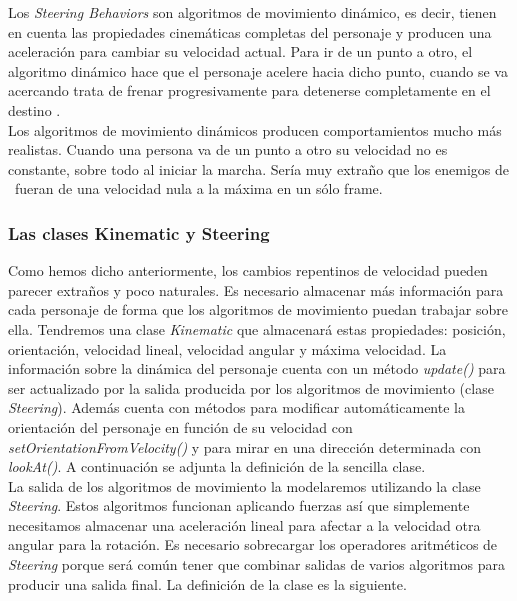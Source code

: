 Los \textit{Steering Behaviors} son algoritmos de movimiento dinámico,
es decir, tienen en cuenta las propiedades cinemáticas completas del personaje
y producen una aceleración para cambiar su velocidad actual. Para ir de un
punto a otro, el algoritmo dinámico hace que el personaje acelere hacia dicho
punto, cuando se va acercando trata de frenar progresivamente para detenerse
completamente en el destino \cite{mill09}.\\

Los algoritmos de movimiento dinámicos producen comportamientos mucho más
realistas. Cuando una persona va de un punto a otro su velocidad no es constante,
sobre todo al iniciar la marcha. Sería muy extraño que los enemigos de \juego\
fueran de una velocidad nula a la máxima en un sólo frame.\\


\subsubsection{Las clases Kinematic y Steering}

Como hemos dicho anteriormente, los cambios repentinos de velocidad pueden
parecer extraños y poco naturales. Es necesario almacenar más información
para cada personaje de forma que los algoritmos de movimiento puedan trabajar
sobre ella. Tendremos una clase \textit{Kinematic} que almacenará estas propiedades:
posición, orientación, velocidad lineal, velocidad angular y máxima velocidad.
La información sobre la dinámica del personaje cuenta con un método
\textit{update()} para ser actualizado por la salida producida por los
algoritmos de movimiento (clase \textit{Steering}). Además cuenta con métodos
para modificar automáticamente la orientación del personaje en función
de su velocidad con \textit{setOrientationFromVelocity()} y para mirar
en una dirección determinada con \textit{lookAt()}. A continuación se adjunta
la definición de la sencilla clase.\\



La salida de los algoritmos de movimiento la modelaremos utilizando la clase
\textit{Steering}. Estos algoritmos funcionan aplicando fuerzas así que
simplemente necesitamos almacenar una aceleración lineal para afectar a la
velocidad otra angular para la rotación. Es necesario sobrecargar los operadores
aritméticos de \textit{Steering} porque será común tener que combinar salidas
de varios algoritmos para producir una salida final. La definición de la clase
es la siguiente.\\

